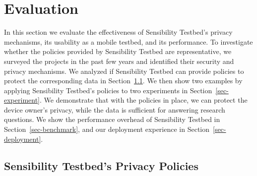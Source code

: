 \section{Evaluation}\label{sec-eval}

In this section we evaluate the effectiveness of Sensibility Testbed's 
privacy mechanisms, its usability as a mobile testbed, and its 
performance. To investigate whether the policies provided by 
Sensibility Testbed are representative, we surveyed the projects
in the past few years and identified their security and privacy 
mechanisms. We analyzed if Sensibility Testbed can provide policies 
to protect the corresponding data in Section~\ref{sec-our-policies}. 
We then show two examples by applying Sensibility Testbed's 
policies to two experiments in Section~\ref{sec-experiment}. We 
demonstrate that with the policies in place, we can protect the 
device owner's privacy, while the data is sufficient for answering 
research questions. We show the performance overhead of 
Sensibility Testbed in Section~\ref{sec-benchmark}, and our 
deployment experience in Section~\ref{sec-deployment}.



\subsection{Sensibility Testbed's Privacy Policies}\label{sec-our-policies}

